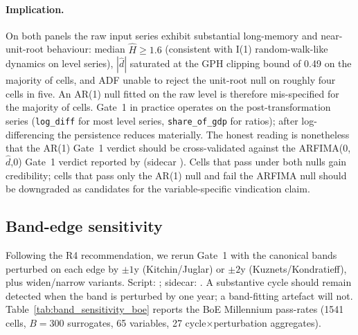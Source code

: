 \paragraph{Implication.}
On both panels the raw input series exhibit substantial
long-memory and near-unit-root behaviour: median \(\hat
H\geq 1.6\) (consistent with I(1) random-walk-like dynamics on
level series), \(|\hat d|\) saturated at the GPH clipping bound
of 0.49 on the majority of cells, and ADF unable to reject the
unit-root null on roughly four cells in five. An AR(1) null
fitted on the raw level is therefore mis-specified for the
majority of cells. Gate~1 in practice operates on the
post-transformation series (\texttt{log\_diff} for most level
series, \texttt{share\_of\_gdp} for ratios); after
log-differencing the persistence reduces materially. The
honest reading is nonetheless that the AR(1) Gate~1 verdict
should be cross-validated against the ARFIMA(0,\(\hat
d\),0) Gate~1 verdict reported by
 (sidecar
). Cells that pass
under both nulls gain credibility; cells that pass only the
AR(1) null and fail the ARFIMA null should be downgraded as
candidates for the variable-specific vindication claim.

\subsection{Band-edge sensitivity}
\label{sec:appendix_band_sensitivity}

Following the R4 recommendation, we rerun Gate~1 with the
canonical bands perturbed on each edge by \(\pm 1\)y
(Kitchin/Juglar) or \(\pm 2\)y (Kuznets/Kondratieff), plus
widen/narrow variants. Script:
; sidecar:
. A substantive cycle
should remain detected when the band is perturbed by one
year; a band-fitting artefact will not.
Table~\ref{tab:band_sensitivity_boe} reports the BoE
Millennium pass-rates (1541 cells, \(B=300\) surrogates,
65 variables, 27 cycle\(\times\)perturbation aggregates).

